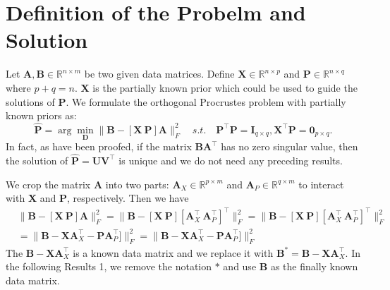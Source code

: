 \documentclass[titlepage,11pt,twoside]{article}
\begin{document}
\section{Definition of the Probelm and Solution}
Let $\mathbf{A},\mathbf{B}\in \mathbb{R}^{n\times m}$ be two given data matrices. Define $\mathbf{X}\in\mathbb{R}^{n\times p}$ and $\mathbf{P}\in\mathbb{R}^{n\times q}$ where $p+q=n$. $\mathbf{X}$ is the partially known prior which could be used to guide the solutions of $\mathbf{P}$. We formulate the orthogonal Procrustes problem with partially known priors as:
\begin{equation}
\mathbf{\hat{P}}=\arg\min_{\mathbf{D}}\|\mathbf{B}-[\mathbf{X}\ \mathbf{P}]\mathbf{A}\|_{F}^{2}
\quad
s.t.
\quad
\mathbf{P}^{\top}\mathbf{P} = \mathbf{I}_{q\times q}, \mathbf{X}^{\top}\mathbf{P} = \mathbf{0}_{p\times q}.
\end{equation} 
In fact, as have been proofed, if the matrix $\mathbf{\mathbf{B}\mathbf{A}^{\top}}$ has no zero singular value, then the solution of  
$\mathbf{\hat{P}} = \mathbf{U}\mathbf{V}^{\top}$ is unique and we do not need any preceding results.

We crop the matrix $\mathbf{A}$ into two parts: $\mathbf{A}_{X}\in\mathbb{R}^{p\times m}$ and $\mathbf{A}_{P}\in\mathbb{R}^{q\times m}$ to interact with $\mathbf{X}$ and $\mathbf{P}$, respectively. Then we have 
\begin{equation}
\begin{split}
&
\|\mathbf{B}-[\mathbf{X}\ \mathbf{P}]\mathbf{A}\|_{F}^{2}
=\|\mathbf{B}-[\mathbf{X}\ \mathbf{P}][\mathbf{A}_{X}^{\top}\ \mathbf{A}_{P}^{\top}]^{\top}\|_{F}^{2}
=\|\mathbf{B}-[\mathbf{X}\ \mathbf{P}][\mathbf{A}_{X}^{\top}\ \mathbf{A}_{P}^{\top}]^{\top}\|_{F}^{2}
\\
&
=\|\mathbf{B}-\mathbf{X}\mathbf{A}_{X}^{\top} - \mathbf{P}\mathbf{A}_{P}^{\top}]\|_{F}^{2}
=\|\mathbf{B}-\mathbf{X}\mathbf{A}_{X}^{\top} - \mathbf{P}\mathbf{A}_{P}^{\top}]\|_{F}^{2}
\end{split}
\end{equation}
The $\mathbf{B}-\mathbf{X}\mathbf{A}_{X}^{\top}$ is a known data matrix and we replace it with 
$\mathbf{B}^{*}=\mathbf{B}-\mathbf{X}\mathbf{A}_{X}^{\top}$. In the following Results 1, we remove the notation $*$ and use $\mathbf{B}$ as the finally known data matrix.
\end{document}
